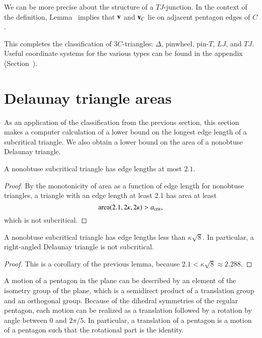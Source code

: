 We can be more precise about the structure of a $TJ$-junction.  In the
context of the definition, Lemma~ implies that ${\mathbf v}$
and ${\mathbf v}_C$ lie on adjacent pentagon edges of $C$.

This completes the classification of $3C$-triangles: $\Delta$,
pinwheel, pin-$T$, $LJ$, and $TJ$.  Useful coordinate systems for the
various types can be found in the appendix
(Section~).

\section{Delaunay triangle areas}

As an application of the classification from the previous section,
this section makes a computer calculation of a lower bound on the
longest edge length of a subcritical triangle.  We also obtain a lower
bound on the area of a nonobtuse Delaunay triangle.

\begin{lemma} 
  A nonobtuse subcritical triangle has edge lengths at most $2.1$.
\end{lemma}

\begin{proof} By the monotonicity of area as a function of edge length
  for nonobtuse triangles, a triangle with an edge length at least
  $2.1$ has area at least
\[
{\operatorname{area}}(2.1,2\kappa,2\kappa) > a_\text{crit},
\] %
which is not subcritical.
\end{proof}

\begin{lemma} 
  A nonobtuse subcritical triangle has edge lengths less than
  $\kappa\sqrt8$.  In particular, a right-angled Delaunay triangle is
  not subcritical.
\end{lemma}

\begin{proof}  
  This is a corollary of the previous lemma, because $2.1 <
  \kappa\sqrt8 \approx 2.288$.
\end{proof}

\begin{remark}
  A motion of a pentagon in the plane can be described by an element
  of the isometry group of the plane, which is a semidirect product of
  a translation group and an orthogonal group.  Because of the
  dihedral symmetries of the regular pentagon, each motion can be
  realized as a translation followed by a rotation by angle between
  $0$ and $2\pi/5$.  In particular, a translation of a pentagon is a
  motion of a pentagon such that the rotational part is the identity.
\end{remark}


